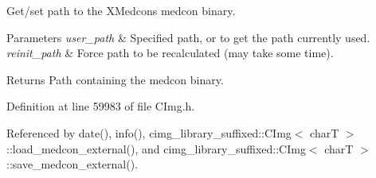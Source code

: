 Get/set path to the X\+Medcon\textquotesingle{}s {\ttfamily medcon} binary. 


\begin{DoxyParams}{Parameters}
{\em user\+\_\+path} & Specified path, or {} to get the path currently used. \\
\hline
{\em reinit\+\_\+path} & Force path to be recalculated (may take some time). \\
\hline
\end{DoxyParams}
\begin{DoxyReturn}{Returns}
Path containing the {\ttfamily medcon} binary. 
\end{DoxyReturn}


Definition at line 59983 of file C\+Img.\+h.



Referenced by date(), info(), cimg\+\_\+library\+\_\+suffixed\+::\+C\+Img$<$ char\+T $>$\+::load\+\_\+medcon\+\_\+external(), and cimg\+\_\+library\+\_\+suffixed\+::\+C\+Img$<$ char\+T $>$\+::save\+\_\+medcon\+\_\+external().

